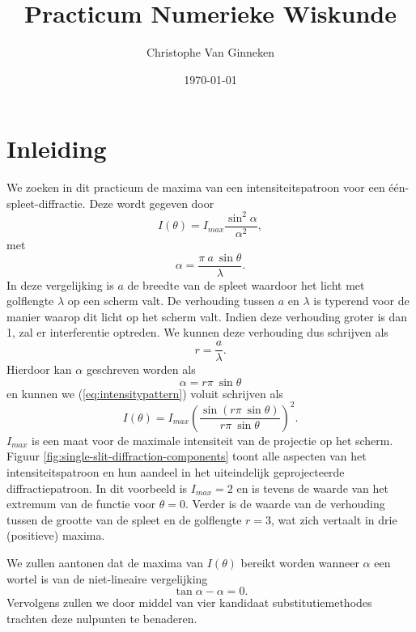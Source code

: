 \documentclass[12pt,a4paper]{article}
\title{\vspace{-6ex}Practicum Numerieke Wiskunde\vspace{-1.5ex}}
\author{Christophe Van Ginneken}
\date{\vspace{-1.5ex}\today}
\begin{document}
\maketitle
\vspace{-2cm}
\section{Inleiding}

We zoeken in dit practicum de maxima van een intensiteitspatroon voor een \'e\'en-spleet-diffractie. Deze wordt gegeven door
\begin{equation} \label{eq:intensitypattern}
I(\theta) = I_{max} \frac{\sin^2 \alpha}{\alpha^2},
\end{equation}
met
\begin{equation} \label{eq:alpha}
\alpha = \frac{\pi \ a \ \sin \theta}{\lambda}.
\end{equation}
In deze vergelijking is $a$ de breedte van de spleet waardoor het licht met golflengte $\lambda$ op een scherm valt. De verhouding tussen $a$ en $\lambda$ is typerend voor de manier waarop dit licht op het scherm valt. Indien deze verhouding groter is dan 1, zal er interferentie optreden. We kunnen deze verhouding dus schrijven als
\begin{equation} \label{eq:a/lambda}
r=\frac{a}{\lambda}.
\end{equation}
Hierdoor kan $\alpha$ geschreven worden als
\begin{equation} \label{eq:alpha-simple}
\alpha = r \pi \ \sin\theta
\end{equation}
en kunnen we (\ref{eq:intensitypattern}) voluit schrijven als
\begin{equation} \label{eq:intensitypattern-full}
I(\theta) = I_{max} \left(\frac{\sin(r \pi \ \sin \theta)}{r \pi \ \sin \theta}\right)^2.
\end{equation}
$I_{max}$ is een maat voor de maximale intensiteit van de projectie op het scherm. Figuur \ref{fig:single-slit-diffraction-components} toont alle aspecten van het intensiteitspatroon en hun aandeel in het uiteindelijk geprojecteerde diffractiepatroon. In dit voorbeeld is $I_{max} = 2$ en is tevens de waarde van het extremum van de functie voor $\theta = 0$. Verder is de waarde van de verhouding tussen de grootte van de spleet en de golflengte $r=3$, wat zich vertaalt in drie (positieve) maxima.

We zullen aantonen dat de maxima van $I(\theta)$ bereikt worden wanneer $\alpha$ een wortel is van de niet-lineaire vergelijking
\begin{equation} \label{eq:non-linear}
\tan\alpha - \alpha = 0.
\end{equation}
Vervolgens zullen we door middel van vier kandidaat substitutiemethodes trachten deze nulpunten te benaderen.
\end{document}
